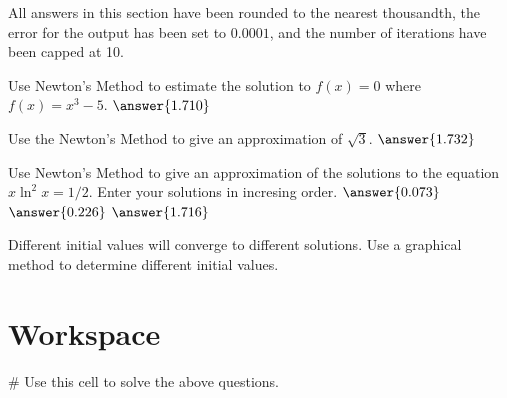 \documentclass{ximera}
\begin{document}
All answers in this section have been rounded to the nearest thousandth, the error for the output has been set to $0.0001$, and the number of iterations have been capped at 10.

\begin{question}
	Use Newton's Method to estimate the solution to $f(x)=0$ where $f(x)=x^3-5$. $\answer{1.710}$
\end{question}

\begin{question}
	Use the Newton's Method to give an approximation of $\sqrt{3}$. $\answer{1.732}$
\end{question}

\begin{question}
	Use Newton's Method to give an approximation of the solutions to the equation $x\ln^2{x}=1/2$. Enter your solutions in incresing order. $\answer{0.073}$ $\answer{0.226}$ $\answer{1.716}$
	\begin{hint}
	Different initial values will converge to different solutions. Use a graphical method to determine different initial values.
	\end{hint}
\end{question}

\section{Workspace}

\begin{sageCell}
# Use this cell to solve the above questions.
\end{sageCell}
\end{document}
